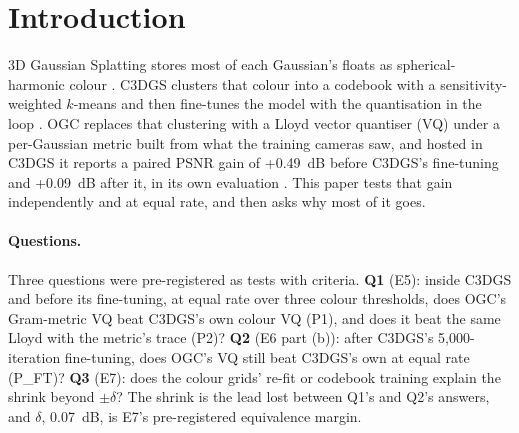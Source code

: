 \section{Introduction}
\label{sec:intro}

3D Gaussian Splatting stores most of each Gaussian's floats as spherical-harmonic colour \citep{kerbl2023gaussian}.
C3DGS clusters that colour into a codebook with a sensitivity-weighted $k$-means and then fine-tunes the model with the quantisation in the loop \citep{niedermayr2024compressed}.
OGC replaces that clustering with a Lloyd vector quantiser (VQ) under a per-Gaussian metric built from what the training cameras saw, and hosted in C3DGS it reports a paired PSNR gain of +0.49~dB before C3DGS's fine-tuning and +0.09~dB after it, in its own evaluation \citep[Table~1]{pietroszek2026only}. %
This paper tests that gain independently and at equal rate, and then asks why most of it goes. %

\paragraph{Questions.}
Three questions were pre-registered as tests with criteria.
\textbf{Q1} (E5): inside C3DGS and before its fine-tuning, at equal rate over three colour thresholds, does OGC's Gram-metric VQ beat C3DGS's own colour VQ (P1), and does it beat the same Lloyd with the metric's trace (P2)? %
\textbf{Q2} (E6 part (b)): after C3DGS's 5,000-iteration fine-tuning, does OGC's VQ still beat C3DGS's own at equal rate (P\_FT)? %
\textbf{Q3} (E7): does the colour grids' re-fit or codebook training explain the shrink beyond $\pm\delta$? %
The shrink is the lead lost between Q1's and Q2's answers, and $\delta$, 0.07~dB, is E7's pre-registered equivalence margin. %

